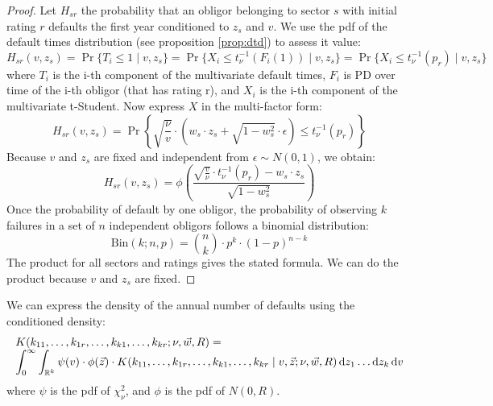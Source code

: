 \documentclass[11pt,fleqn]{book} %
\begin{document}
\begin{proof}
	Let $H_{sr}$ the probability that an obligor belonging to sector $s$
	with initial rating $r$ defaults the first year conditioned to $z_s$ 
	and $v$. We use the pdf of the default times distribution (see proposition 
	\ref{prop:dtd}) to assess it value:
	\begin{displaymath}
		H_{sr}(v,z_s) = 
		\Pr\{T_i \le 1 \mid v, z_s\} = 
		\Pr\{ X_i \le t_{\nu}^{-1}(F_i(1)) \mid v, z_s\} = 
		\Pr\{ X_i \le t_{\nu}^{-1}(p_r) \mid v, z_s\}
	\end{displaymath}
	where $T_i$ is the i-th component of the multivariate default 
	times, $F_i$ is PD over time of the i-th obligor (that has 
	rating r), and $X_i$ is the i-th component of the multivariate 
	t-Student. Now express $X$ in the multi-factor form:
	\begin{displaymath}
		H_{sr}(v,z_s) = \Pr \left\{ 
		\sqrt{\frac{\nu}{v}} \cdot \left( w_s \cdot z_s + \sqrt{1-w_s^2} \cdot \epsilon\right)
		\le t_{\nu}^{-1}(p_r)
		\right\}
	\end{displaymath}
	Because $v$ and $z_s$ are fixed and independent from $\epsilon \sim N(0,1)$, we obtain:
	\begin{displaymath}
		H_{sr}(v,z_s) = \phi\left(  
		\frac{\sqrt{\frac{v}{\nu}} \cdot t_{\nu}^{-1}(p_r) - w_s\cdot z_s}{\sqrt{1-w_s^2}}
		\right)
	\end{displaymath}
	Once the probability of default by one obligor, the probability of 
	observing $k$ failures in a set of $n$ independent obligors follows 
	a binomial distribution:
	\begin{displaymath}
		\text{Bin}(k;n,p) = \binom{n}{k} \cdot p^k \cdot (1-p)^{n-k}
	\end{displaymath}
	The product for all sectors and ratings gives the stated formula. 
	We can do the product because $v$ and $z_s$ are fixed.
\end{proof}

\begin{corollary}
	We can express the density of the annual number of defaults using 
	the conditioned density:
	\begin{displaymath}
		\begin{array}{l}
			K(k_{11},\dots,k_{1r},\dots,k_{k1},\dots,k_{kr} ; \nu, \vec{w}, R) =                \\
			\displaystyle \int_0^{\infty} \int_{\mathbb{R}^k}                                         
			\psi(v) \cdot \phi(\vec{z}) \cdot                                                   
			K(k_{11},\dots,k_{1r},\dots,k_{k1},\dots,k_{kr} \mid v,\vec{z}; \nu,\vec{w}, R) 
			\mathop{\mathrm{{}d}}\mathopen{} z_1 \dots \mathop{\mathrm{{}d}}\mathopen{} z_k \mathop{\mathrm{{}d}}\mathopen{} v                                                               
		\end{array}
	\end{displaymath}
	where $\psi$ is the pdf of $\chi_{\nu}^2$, and $\phi$ is the pdf of $N(0,R)$.
\end{corollary}
\end{document}
